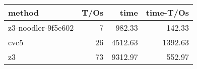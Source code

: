 \begin{tabular}{lrrr}
\hline
 method             &   T/Os &    time &   time-T/Os \\
\hline
 z3-noodler-9f5e602 &      7 &  982.33 &      142.33 \\
 cvc5               &     26 & 4512.63 &     1392.63 \\
 z3                 &     73 & 9312.97 &      552.97 \\
\hline
\end{tabular}
